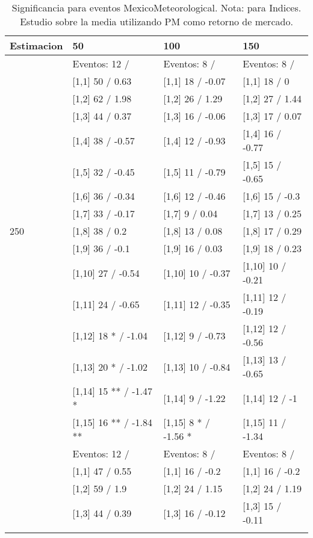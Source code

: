 \begin{table}

\caption{Significancia para eventos MexicoMeteorological. Nota: para Indices. Estudio sobre la media utilizando PM como retorno de mercado.}
\centering
\begin{tabular}[t]{llll}
\toprule
Estimacion & 50 & 100 & 150\\
\midrule
 & Eventos:  12 / & Eventos:  8 / & Eventos:  8 /\\
 & {}[1,1] 50  / 0.63 & {}[1,1] 18  / -0.07 & {}[1,1] 18  / 0\\
 & {}[1,2] 62  / 1.98 & {}[1,2] 26  / 1.29 & {}[1,2] 27  / 1.44\\
 & {}[1,3] 44  / 0.37 & {}[1,3] 16  / -0.06 & {}[1,3] 17  / 0.07\\
 & {}[1,4] 38  / -0.57 & {}[1,4] 12  / -0.93 & {}[1,4] 16  / -0.77\\
\addlinespace
 & {}[1,5] 32  / -0.45 & {}[1,5] 11  / -0.79 & {}[1,5] 15  / -0.65\\
 & {}[1,6] 36  / -0.34 & {}[1,6] 12  / -0.46 & {}[1,6] 15  / -0.3\\
 & {}[1,7] 33  / -0.17 & {}[1,7] 9  / 0.04 & {}[1,7] 13  / 0.25\\
250 & {}[1,8] 38  / 0.2 & {}[1,8] 13  / 0.08 & {}[1,8] 17  / 0.29\\
 & {}[1,9] 36  / -0.1 & {}[1,9] 16  / 0.03 & {}[1,9] 18  / 0.23\\
\addlinespace
 & {}[1,10] 27  / -0.54 & {}[1,10] 10  / -0.37 & {}[1,10] 10  / -0.21\\
 & {}[1,11] 24  / -0.65 & {}[1,11] 12  / -0.35 & {}[1,11] 12  / -0.19\\
 & {}[1,12] 18 * / -1.04 & {}[1,12] 9  / -0.73 & {}[1,12] 12  / -0.56\\
 & {}[1,13] 20 * / -1.02 & {}[1,13] 10  / -0.84 & {}[1,13] 13  / -0.65\\
 & {}[1,14] 15 ** / -1.47 * & {}[1,14] 9  / -1.22 & {}[1,14] 12  / -1\\
\addlinespace
 & {}[1,15] 16 ** / -1.84 ** & {}[1,15] 8 * / -1.56 * & {}[1,15] 11  / -1.34\\
 & Eventos:  12 / & Eventos:  8 / & Eventos:  8 /\\
 & {}[1,1] 47  / 0.55 & {}[1,1] 16  / -0.2 & {}[1,1] 16  / -0.2\\
 & {}[1,2] 59  / 1.9 & {}[1,2] 24  / 1.15 & {}[1,2] 24  / 1.19\\
 & {}[1,3] 44  / 0.39 & {}[1,3] 16  / -0.12 & {}[1,3] 15  / -0.11\\
\addlinespace

\end{tabular}
\end{table}
